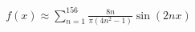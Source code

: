 \documentclass[preview]{standalone}
\begin{document}
\begin{align*}
f(x) \approx \sum_{n=1}^{156} \frac{8n}{\pi(4n^2-1)} \sin(2nx)
\end{align*}
\end{document}
